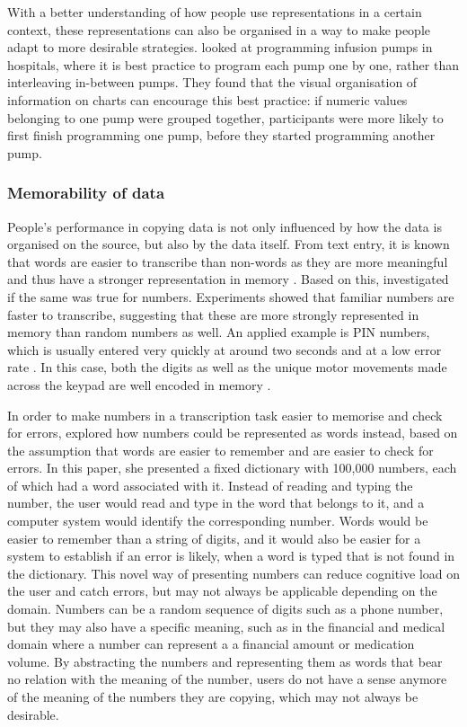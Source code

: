 \documentclass[11pt,oneside]{report}
\begin{document}
With a better understanding of how people use representations in a certain context, these representations can also be organised in a way to make people adapt to more desirable strategies. \citet{Back2013b} looked at programming infusion pumps in hospitals, where it is best practice to program each pump one by one, rather than interleaving in-between pumps. They found that the visual organisation of information on charts can encourage this best practice: if numeric values belonging to one pump were grouped together, participants were more likely to first finish programming one pump, before they started programming another pump.

\subsubsection{Memorability of data}
People's performance in copying data is not only influenced by how the data is organised on the source, but also by the data itself.
From text entry, it is known that words are easier to transcribe than non-words as they are more meaningful and thus have a stronger representation in memory \citep{Salthouse1986}. Based on this, \citet{Wiseman2014} investigated if the same was true for numbers. Experiments showed that familiar numbers are faster to transcribe, suggesting that these are more strongly represented in memory than random numbers as well.
An applied example is PIN numbers, which is usually entered very quickly at around two seconds and at a low error rate \citep{DeLuca2010}. In this case, both the digits as well as the unique motor movements made across the keypad are well encoded in memory \citep{Mangen2010}. 

In order to make numbers in a transcription task easier to memorise and check for errors, \citet{Sandnes2013} explored how numbers could be represented as words instead, based on the assumption that words are easier to remember and are easier to check for errors. 
In this paper, she presented a fixed dictionary with 100,000 numbers, each of which had a word associated with it. 
Instead of reading and typing the number, the user would read and type in the word that belongs to it, and a computer system would identify the corresponding number. 
Words would be easier to remember than a string of digits, and it would also be easier for a system to establish if an error is likely, when a word is typed that is not found in the dictionary. This novel way of presenting numbers can reduce cognitive load on the user and catch errors, but may not always be applicable depending on the domain. Numbers can be a random sequence of digits such as a phone number, but they may also have a specific meaning, such as in the financial and medical domain where a number can represent a a financial amount or medication volume.
By abstracting the numbers and representing them as words that bear no relation with the meaning of the number, users do not have a sense anymore of the meaning of the numbers they are copying, which may not always be desirable.
\end{document}
